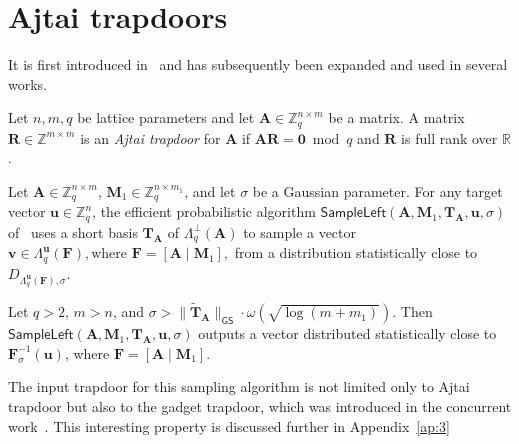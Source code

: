 \noindent\section{Ajtai trapdoors} 

It is first introduced in~\cite{EC:ABB10} and has subsequently been expanded and used in several works.


\begin{definition}
Let $n,m,q$ be lattice parameters and let $\mathbf{A} \in \mathbb{Z}_q^{n \times m}$ be a matrix. 
A matrix $\mathbf{R} \in \mathbb{Z}^{m \times m}$ is an \emph{Ajtai trapdoor} for $\mathbf{A}$ if 
$\mathbf{A}\mathbf{R} = \mathbf{0} \bmod q$ and $\mathbf{R}$ is full rank over $\mathbb{R}$. 
\end{definition}


\begin{definition}


Let $\mathbf A \in \mathbb Z_q^{n \times m}$, 
$\mathbf M_1 \in \mathbb Z_q^{n \times m_1}$, and let $\sigma$ be a Gaussian parameter. 
For any target vector $\mathbf u \in \mathbb Z_q^n$, the efficient probabilistic algorithm
$
    \mathsf{SampleLeft}(\mathbf A,\mathbf M_1,\mathbf T_{\mathbf A},\mathbf u,\sigma)
$
of~\cite{EC:ABB10} uses a short basis $\mathbf T_{\mathbf A}$ of 
$\Lambda_q^\perp(\mathbf A)$ to sample a vector
$
    \mathbf v \in \Lambda_q^{\mathbf u}(\mathbf F),
    \text{where } \mathbf F = [\mathbf A \mid \mathbf M_1],
$
from a distribution statistically close to 
$D_{\Lambda_q^{\mathbf u}(\mathbf F),\sigma}$.


\end{definition}

\begin{lemma}
\label{lem:sampleleft}
Let $q>2$, $m>n$, and
$
\sigma > \|\widetilde{\mathbf T}_{\mathbf A}\|_{\mathsf{GS}}
\cdot \omega(\sqrt{\log(m+m_1)}).
$
Then $\mathsf{SampleLeft}(\mathbf A,\mathbf M_1,\mathbf T_{\mathbf A},\mathbf u,\sigma)$ outputs a vector distributed statistically close to $\mathbf F_\sigma^{-1}(\mathbf u)$, where $\mathbf F=[\mathbf A\mid \mathbf M_1]$.
\end{lemma}

The input trapdoor for this sampling algorithm is not limited only to Ajtai trapdoor but also to the gadget trapdoor, which was introduced in the concurrent work~\cite{C:MicPei12}. This interesting property is discussed further in Appendix~\ref{ap:3}


